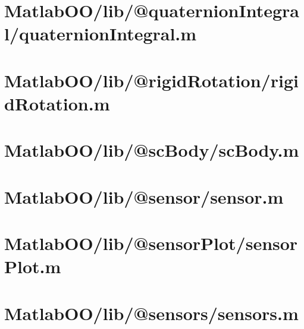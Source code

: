 \pagebreak
\section{MatlabOO/lib/@quaternionIntegral/quaternionIntegral.m}\label{code:MatlabOO/lib/@quaternionIntegral/quaternionIntegral.m}


\pagebreak
\section{MatlabOO/lib/@rigidRotation/rigidRotation.m}\label{code:MatlabOO/lib/@rigidRotation/rigidRotation.m}


\pagebreak
\section{MatlabOO/lib/@scBody/scBody.m}\label{code:MatlabOO/lib/@scBody/scBody.m}


\pagebreak
\section{MatlabOO/lib/@sensor/sensor.m}\label{code:MatlabOO/lib/@sensor/sensor.m}


\pagebreak
\section{MatlabOO/lib/@sensorPlot/sensorPlot.m}\label{code:MatlabOO/lib/@sensorPlot/sensorPlot.m}


\pagebreak
\section{MatlabOO/lib/@sensors/sensors.m}\label{code:MatlabOO/lib/@sensors/sensors.m}


\pagebreak
